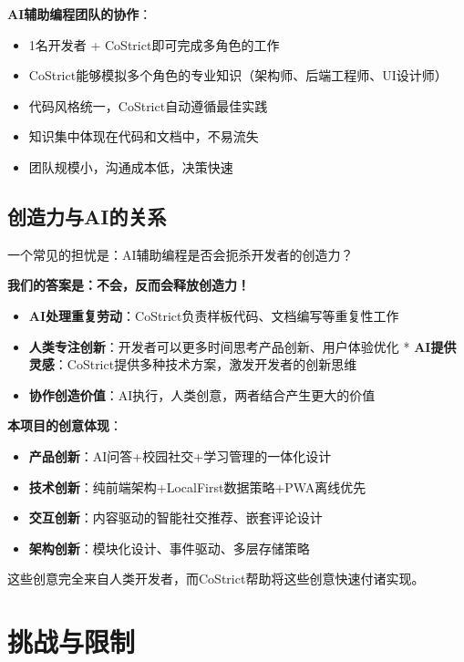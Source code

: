 ﻿\documentclass[12pt,a4paper]{article}
\begin{document}
\textbf{AI辅助编程团队的协作}：

\begin{itemize}
    \item 1名开发者 + CoStrict即可完成多角色的工作
    \item CoStrict能够模拟多个角色的专业知识（架构师、后端工程师、UI设计师）
    \item 代码风格统一，CoStrict自动遵循最佳实践
    \item 知识集中体现在代码和文档中，不易流失
    \item 团队规模小，沟通成本低，决策快速
\end{itemize}

\subsection{创造力与AI的关系}

一个常见的担忧是：AI辅助编程是否会扼杀开发者的创造力？

\textbf{我们的答案是：不会，反而会释放创造力！}

\begin{itemize}
    \item \textbf{AI处理重复劳动}：CoStrict负责样板代码、文档编写等重复性工作
    \item \textbf{人类专注创新}：开发者可以更多时间思考产品创新、用户体验优化
    * \textbf{AI提供灵感}：CoStrict提供多种技术方案，激发开发者的创新思维
    \item \textbf{协作创造价值}：AI执行，人类创意，两者结合产生更大的价值
\end{itemize}

\textbf{本项目的创意体现}：

\begin{itemize}
    \item \textbf{产品创新}：AI问答+校园社交+学习管理的一体化设计
    \item \textbf{技术创新}：纯前端架构+LocalFirst数据策略+PWA离线优先
    \item \textbf{交互创新}：内容驱动的智能社交推荐、嵌套评论设计
    \item \textbf{架构创新}：模块化设计、事件驱动、多层存储策略
\end{itemize}

这些创意完全来自人类开发者，而CoStrict帮助将这些创意快速付诸实现。

\section{挑战与限制}
\end{document}
